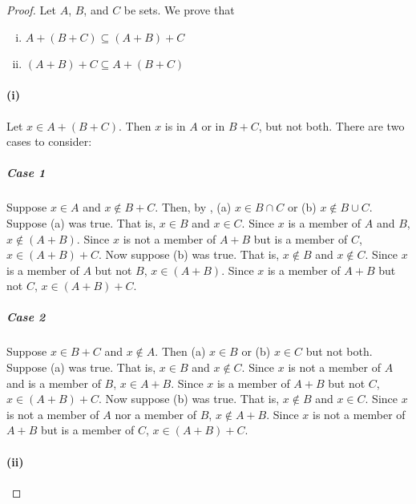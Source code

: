 \documentclass{report}
\begin{document}
\begin{proof}


  \noindent Let $A$, $B$, and $C$ be sets.
  We prove that
    \begin{enumerate}[(i)]
      \item $A + (B + C) \subseteq (A + B) + C$
      \item $(A + B) + C \subseteq A + (B + C)$
    \end{enumerate}

  \paragraph{(i)}%
  \label{par:exercise-2.15b-i}

    Let $x \in A + (B + C)$.
    Then $x$ is in $A$ or in $B + C$, but not both.
    There are two cases to consider:

    \subparagraph{Case 1}%

      Suppose $x \in A$ and $x \not\in B + C$.
      Then, by ,
        (a) $x \in B \cap C$ or (b) $x \not\in B \cup C$.
      Suppose (a) was true.
      That is, $x \in B$ and $x \in C$.
      Since $x$ is a member of $A$ and $B$, $x \not\in (A + B)$.
      Since $x$ is not a member of $A + B$ but is a member of $C$,
        $x \in (A + B) + C$.
      Now suppose (b) was true.
      That is, $x \not\in B$ and $x \not\in C$.
      Since $x$ is a member of $A$ but not $B$, $x \in (A + B)$.
      Since $x$ is a member of $A + B$ but not $C$, $x \in (A + B) + C$.

    \subparagraph{Case 2}%

      Suppose $x \in B + C$ and $x \not\in A$.
      Then (a) $x \in B$ or (b) $x \in C$ but not both.
      Suppose (a) was true.
      That is, $x \in B$ and $x \not\in C$.
      Since $x$ is not a member of $A$ and is a member of $B$, $x \in A + B$.
      Since $x$ is a member of $A + B$ but not $C$, $x \in (A + B) + C$.
      Now suppose (b) was true.
      That is, $x \not\in B$ and $x \in C$.
      Since $x$ is not a member of $A$ nor a member of $B$, $x \not\in A + B$.
      Since $x$ is not a member of $A + B$ but is a member of $C$,
        $x \in (A + B) + C$.

  \paragraph{(ii)}%
  \label{par:exercise-2.15b-ii}


\end{proof}
\end{document}
